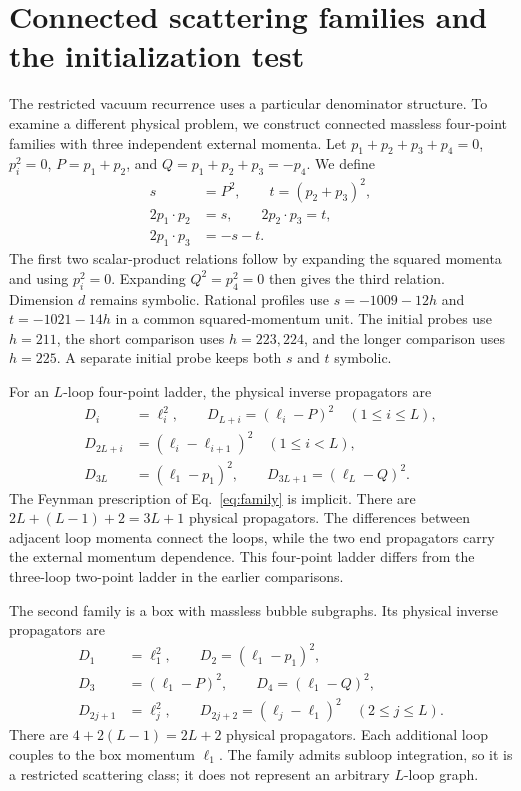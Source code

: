 \section{Connected scattering families and the initialization test}
\label{app:higher-scattering}
The restricted vacuum recurrence uses a particular denominator structure. To examine a different physical problem, we construct connected massless four-point families with three independent external momenta. Let $p_1+p_2+p_3+p_4=0$, $p_i^2=0$, $P=p_1+p_2$, and $Q=p_1+p_2+p_3=-p_4$. We define
\begin{equation}
 \begin{aligned}
 s&=P^2,\qquad t=(p_2+p_3)^2,\\
 2p_1\!\cdot p_2&=s,\qquad 2p_2\!\cdot p_3=t,\\
 2p_1\!\cdot p_3&=-s-t.
 \end{aligned}
 \label{eq:higher-kinematics}
\end{equation}
The first two scalar-product relations follow by expanding the squared momenta and using $p_i^2=0$. Expanding $Q^2=p_4^2=0$ then gives the third relation. Dimension $d$ remains symbolic. Rational profiles use $s=-1009-12h$ and $t=-1021-14h$ in a common squared-momentum unit. The initial probes use $h=211$, the short comparison uses $h=223,224$, and the longer comparison uses $h=225$. A separate initial probe keeps both $s$ and $t$ symbolic.

For an $L$-loop four-point ladder, the physical inverse propagators are
\begin{equation}
 \begin{aligned}
 D_i&=\ell_i^2,\qquad D_{L+i}=(\ell_i-P)^2 \quad(1\leq i\leq L),\\
 D_{2L+i}&=(\ell_i-\ell_{i+1})^2 \quad(1\leq i<L),\\
 D_{3L}&=(\ell_1-p_1)^2,\qquad D_{3L+1}=(\ell_L-Q)^2.
 \end{aligned}
 \label{eq:higher-ladder}
\end{equation}
The Feynman prescription of Eq.~\eqref{eq:family} is implicit. There are $2L+(L-1)+2=3L+1$ physical propagators. The differences between adjacent loop momenta connect the loops, while the two end propagators carry the external momentum dependence. This four-point ladder differs from the three-loop two-point ladder in the earlier comparisons.

The second family is a box with massless bubble subgraphs. Its physical inverse propagators are
\begin{equation}
 \begin{aligned}
 D_1&=\ell_1^2,\qquad D_2=(\ell_1-p_1)^2,\\
 D_3&=(\ell_1-P)^2,\qquad D_4=(\ell_1-Q)^2,\\
 D_{2j+1}&=\ell_j^2,\qquad D_{2j+2}=(\ell_j-\ell_1)^2
 \quad(2\leq j\leq L).
 \end{aligned}
 \label{eq:higher-bubble-box}
\end{equation}
There are $4+2(L-1)=2L+2$ physical propagators. Each additional loop couples to the box momentum $\ell_1$. The family admits subloop integration, so it is a restricted scattering class; it does not represent an arbitrary $L$-loop graph.


